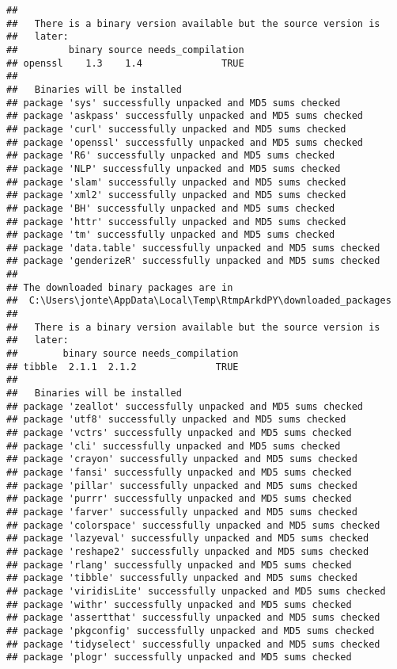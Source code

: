 \documentclass[]{article}
\begin{document}
\begin{verbatim}
## 
##   There is a binary version available but the source version is
##   later:
##         binary source needs_compilation
## openssl    1.3    1.4              TRUE
## 
##   Binaries will be installed
## package 'sys' successfully unpacked and MD5 sums checked
## package 'askpass' successfully unpacked and MD5 sums checked
## package 'curl' successfully unpacked and MD5 sums checked
## package 'openssl' successfully unpacked and MD5 sums checked
## package 'R6' successfully unpacked and MD5 sums checked
## package 'NLP' successfully unpacked and MD5 sums checked
## package 'slam' successfully unpacked and MD5 sums checked
## package 'xml2' successfully unpacked and MD5 sums checked
## package 'BH' successfully unpacked and MD5 sums checked
## package 'httr' successfully unpacked and MD5 sums checked
## package 'tm' successfully unpacked and MD5 sums checked
## package 'data.table' successfully unpacked and MD5 sums checked
## package 'genderizeR' successfully unpacked and MD5 sums checked
## 
## The downloaded binary packages are in
##  C:\Users\jonte\AppData\Local\Temp\RtmpArkdPY\downloaded_packages
## 
##   There is a binary version available but the source version is
##   later:
##        binary source needs_compilation
## tibble  2.1.1  2.1.2              TRUE
## 
##   Binaries will be installed
## package 'zeallot' successfully unpacked and MD5 sums checked
## package 'utf8' successfully unpacked and MD5 sums checked
## package 'vctrs' successfully unpacked and MD5 sums checked
## package 'cli' successfully unpacked and MD5 sums checked
## package 'crayon' successfully unpacked and MD5 sums checked
## package 'fansi' successfully unpacked and MD5 sums checked
## package 'pillar' successfully unpacked and MD5 sums checked
## package 'purrr' successfully unpacked and MD5 sums checked
## package 'farver' successfully unpacked and MD5 sums checked
## package 'colorspace' successfully unpacked and MD5 sums checked
## package 'lazyeval' successfully unpacked and MD5 sums checked
## package 'reshape2' successfully unpacked and MD5 sums checked
## package 'rlang' successfully unpacked and MD5 sums checked
## package 'tibble' successfully unpacked and MD5 sums checked
## package 'viridisLite' successfully unpacked and MD5 sums checked
## package 'withr' successfully unpacked and MD5 sums checked
## package 'assertthat' successfully unpacked and MD5 sums checked
## package 'pkgconfig' successfully unpacked and MD5 sums checked
## package 'tidyselect' successfully unpacked and MD5 sums checked
## package 'plogr' successfully unpacked and MD5 sums checked

\end{verbatim}
\end{document}
